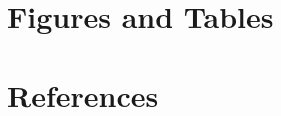 \documentclass[12pt,notitlepage]{article}
\begin{document}
\clearpage
{}
\setcounter{page}{1}
\section{Figures and Tables}




\clearpage
{}
\setcounter{page}{1}
\section{References}
\printbibliography[heading=none]
\end{document}
